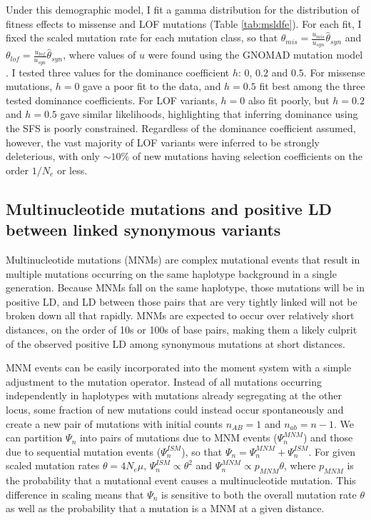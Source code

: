 \documentclass[]{article}
\begin{document}
Under this demographic model, I fit a gamma distribution for the distribution
of fitness effects to missense and LOF mutations (Table \ref{tab:msldfe}). For
each fit, I fixed the scaled mutation rate for each mutation class, so that
\(\theta_{mis} = \frac{u_{mis}}{u_{syn}} \hat\theta_{syn}\) and \(\theta_{lof}
= \frac{u_{lof}}{u_{syn}} \hat\theta_{syn}\), where values of \(u\) were found
using the GNOMAD mutation model \citep{Karczewski2020-le}. I tested three
values for the dominance coefficient \(h\): \(0\), \(0.2\) and \(0.5\). For
missense mutations, \(h=0\) gave a poor fit to the data, and \(h=0.5\) fit best
among the three tested dominance coefficients. For LOF variants, \(h=0\) also
fit poorly, but \(h=0.2\) and \(h=0.5\) gave similar likelihoods, highlighting
that inferring dominance using the SFS is poorly constrained. Regardless of the
dominance coefficient assumed, however, the vast majority of LOF variants were
inferred to be strongly deleterious, with only \(\sim10\%\) of new mutations
having selection coefficients on the order \(1/N_e\) or less.

\subsection{Multinucleotide mutations and positive LD between linked synonymous variants}
\label{sec:mnm}

Multinucleotide mutations (MNMs) are complex mutational events that result in
multiple mutations occurring on the same haplotype background in a single
generation. Because MNMs fall on the same haplotype, those mutations will be in
positive LD, and LD between those pairs that are very tightly linked will not
be broken down all that rapidly. MNMs are expected to occur over relatively
short distances, on the order of 10s or 100s of base pairs, making them a
likely culprit of the observed positive LD among synonymous mutations at short
distances.

MNM events can be easily incorporated into the moment system with a simple
adjustment to the mutation operator. Instead of all mutations occurring
independently in haplotypes with mutations already segregating at the other
locus, some fraction of new mutations could instead occur spontaneously and
create a new pair of mutations with initial counts \(n_{AB}=1\) and
\(n_{ab}=n-1\). We can partition $\Psi_n$ into pairs of mutations due to MNM
events (\(\Psi_n^{MNM}\)) and those due to sequential mutation events
(\(\Psi_n^{ISM}\)), so that \(\Psi_n=\Psi_n^{MNM}+\Psi_n^{ISM}\). For given
scaled mutation rates \(\theta=4N_e\mu\), \(\Psi_n^{ISM}\propto\theta^2\) and
\(\Psi_n^{MNM}\propto p_{MNM}\theta\), where \(p_{MNM}\) is the probability
that a mutational event causes a multinucleotide mutation. This difference in
scaling means that \(\Psi_n\) is sensitive to both the overall mutation rate
\(\theta\) as well as the probability that a mutation is a MNM at a given
distance.
\end{document}
